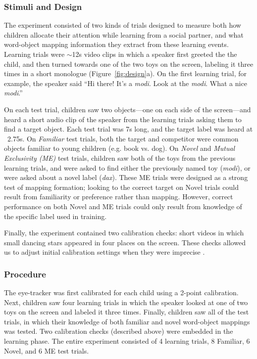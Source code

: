 \documentclass[man,floatsintext]{apa6}
\begin{document}
\subsubsection{Stimuli and Design}

The experiment consisted of two kinds of trials designed to measure both how children allocate their attention while learning from a social partner, and what word-object mapping information they extract from these learning events. Learning trials were $\sim$12s video clips in which a speaker first greeted the the child, and then turned towards one of the two toys on the screen, labeling it three times in a short monologue (Figure~\ref{fig:design}a). On the first learning trial, for example, the speaker said ``Hi there! It's a \emph{modi}. Look at the \emph{modi}. What a nice \emph{modi}.''

On each test trial, children saw two objects---one on each side of the screen---and heard a short audio clip of the speaker from the learning trials asking them to find a target object. Each test trial was 7s long, and the target label was heard at ~2.75s. On \emph{Familiar} test trials, both the target and competitor were common objects familiar to young children (e.g. book vs. dog). On \emph{Novel} and  \emph{Mutual Exclusivity (ME)} test trials, children saw both of the toys from the previous learning trials, and were asked to find either the previously named toy (\emph{modi}), or were asked about a novel label (\emph{dax}). These ME trials were designed as a strong test of mapping formation; looking to the correct target on Novel trials could result from familiarity or preference rather than mapping. However, correct performance on both Novel and ME trials could only result from knowledge of the specific label used in training.

Finally, the experiment contained two calibration checks: short videos in which small dancing stars appeared in four places on the screen. These checks allowed us to adjust initial calibration settings when they were imprecise \cite<for details, see>{Frank2012d}.

\vspace{12pt}

\subsubsection{Procedure}

The eye-tracker was first calibrated for each child using a 2-point calibration. Next, children saw four learning trials in which the speaker looked at one of two toys on the screen and labeled it three times. Finally, children saw all of the test trials, in which their knowledge of both familiar and novel word-object mappings was tested. Two calibration checks (described above) were embedded in the learning phase. The entire experiment consisted of 4 learning trials, 8 Familiar, 6 Novel, and 6 ME test trials.
\end{document}
